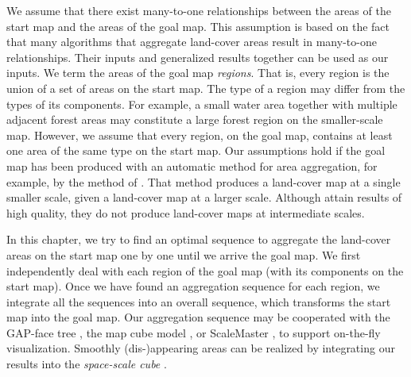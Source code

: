 We assume that there exist many-to-one relationships between the 
areas of the
start map and the areas of the goal map.
This assumption is based on the fact that many algorithms 
\parencite[e.g.,][]{HaunertWolff2010AreaAgg,
vanSmaalen2003,Oehrlein2017Aggregation}
that aggregate land-cover areas
result in many-to-one relationships.
Their inputs and generalized results together
can be used as our inputs.
We term the areas of the goal map \emph{regions}.
That is, every region is the union of a set of areas 
on the start map.
The type of a region may differ from the types of its 
components. 
For example, a small water area together with 
multiple adjacent forest areas may constitute 
a large forest region on the smaller-scale map.
However, we assume that every region, on the goal map, 
contains at least one area of the same type on the start map.
Our assumptions hold if the goal map has been produced 
with an automatic method for area aggregation, 
for example, by the method of \citet{HaunertWolff2010AreaAgg}.
That method produces a land-cover map at a single smaller scale, 
given a land-cover map at a larger scale.
Although \textcite{HaunertWolff2010AreaAgg}
attain results of high quality, 
they do not produce land-cover maps at intermediate scales.

In this chapter, we try to find an optimal sequence
to aggregate the land-cover areas on the start map
one by one until we arrive the goal map.
We first independently deal with each region of the goal map 
(with its components on the start map).
Once we have found an aggregation sequence for each region, 
we integrate all the sequences into an overall sequence,
which transforms the start map into the goal map. 
Our aggregation sequence may be cooperated with
the GAP-face tree \citep{vanOosterom2005},
the map cube model \citep{Timpf1998},
or ScaleMaster \citep{Brewer2007Guidelines,Touya2013ScaleMaster}, 
to support on-the-fly visualization.
Smoothly (dis-)appearing areas can be realized
by integrating our results into the \emph{space-scale cube}
\parencite{vanOosterom2014tGAP,vanOosterom2014tGAPSSC}.


